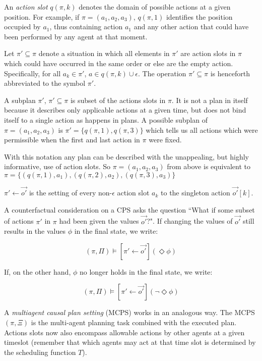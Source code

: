 \documentclass{article}
\theoremstyle{plain}
\theoremstyle{definition}
\begin{document}
An \textit{action slot} $q(\pi,k)$ denotes the domain of possible actions at a given position. For example, if $\pi=(a_1,a_2,a_3)$, $q(\pi,1)$ identifies the position occupied by $a_1$, thus containing action $a_1$ and any other action that could have been performed by any agent at that moment.

Let $\pi'\subseteq \pi$ denote a situation in which all elements in $\pi'$ are action slots in $\pi$ which could have occurred in the same order or else are the empty action. Specifically, for all $a_k \in \pi'$, $a \in q(\pi,k) \cup \epsilon$. The operation $\pi'\subseteq \pi$ is henceforth abbreviated to the symbol $\pi'$.

A subplan $\pi'$, $\pi' \subseteq \pi$ is subset of the actions slots in $\pi$. It is not a plan in itself because it describes only applicable actions at a given time, but does not bind itself to a single action as happens in plans. A possible subplan of $\pi=(a_1, a_2, a_3)$ is $\pi'=\{q(\pi,1), q(\pi,3)\}$ which tells us all actions which were permissible when the first and last action in $\pi$ were fixed.

With this notation any plan can be described with the unappealing, but highly informative, use of action slots. So $\pi=(a_1, a_2, a_3)$ from above is equivalent to $\pi= \{(q(\pi,1),a_1), (q(\pi,2),a_2), (q(\pi,3),a_3)  \}$

$\pi' \leftarrow \vec{o'}$ is the setting of every non-$\epsilon$ action slot $a_k$ to the singleton action $\vec{o'}[k]$.


A counterfactual consideration on a CPS asks the question ``What if some subset of actions $\pi'$ in $\pi$ had been given the values $\vec{o'}$?". If changing the values of $\vec{o'}$ still results in the values $\phi$ in the final state, we write:

\[
(\pi, \Pi) \models [\pi' \leftarrow \vec{o'}](\Diamond \phi)
\]

If, on the other hand, $\phi$ no longer holds in the final state, we write:

\[
(\pi, \Pi) \models [\pi' \leftarrow \vec{o'}](\lnot \Diamond \phi)
\]


A \textit{multiagent causal plan setting} (MCPS) works in an analogous way. The MCPS $(\pi,\Xi)$ is the multi-agent planning task combined with the executed plan. Actions slots now also encompass allowable actions by other agents at a given timeslot (remember that which agents may act at that time slot is determined by the scheduling function $T$).
\end{document}
